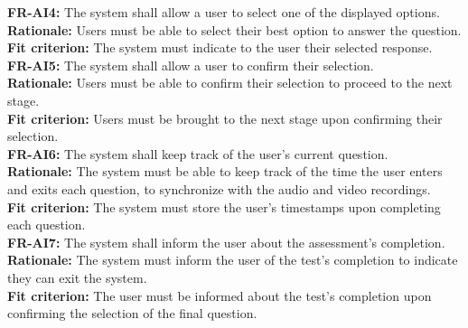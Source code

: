 \documentclass[12pt]{article}
\begin{document}
\textbf{FR-AI4: }The system shall allow a user to select one of the displayed options.\\
\textbf{Rationale: }Users must be able to select their best option to answer the question.\\
\textbf{Fit criterion: }The system must indicate to the user their selected response.\\

\textbf{FR-AI5: }The system shall allow a user to confirm their selection.\\
\textbf{Rationale: }Users must be able to confirm their selection to proceed to the next stage.\\
\textbf{Fit criterion: }Users must be brought to the next stage upon confirming their selection.\\

\textbf{FR-AI6: }The system shall keep track of the user's current question.\\
\textbf{Rationale: }The system must be able to keep track of the time the user enters and exits each question, to synchronize with the audio and video recordings.\\
\textbf{Fit criterion: }The system must store the user's timestamps upon completing each question.\\

\textbf{FR-AI7: }The system shall inform the user about the assessment's completion.\\
\textbf{Rationale: }The system must inform the user of the test's completion to indicate they can exit the system.\\
\textbf{Fit criterion: }The user must be informed about the test's completion upon confirming the selection of the final question.\\
\end{document}
